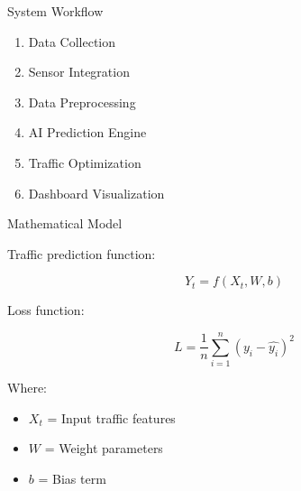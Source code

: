 \documentclass{beamer}
\begin{document}
	\begin{frame}{System Workflow}
		
		\begin{enumerate}
			
			\item Data Collection
			
			\item Sensor Integration
			
			\item Data Preprocessing
			
			\item AI Prediction Engine
			
			\item Traffic Optimization
			
			\item Dashboard Visualization
			
		\end{enumerate}
		
	\end{frame}
	
	
	\begin{frame}{Mathematical Model}
		
		Traffic prediction function:
		
		\[
		Y_t = f(X_t,W,b)
		\]
		
		\vspace{0.5cm}
		
		Loss function:
		
		\[
		L = \frac{1}{n}\sum_{i=1}^{n}(y_i - \hat{y_i})^2
		\]
		
		\vspace{0.5cm}
		
		Where:
		
		\begin{itemize}
			
			\item $X_t$ = Input traffic features
			
			\item $W$ = Weight parameters
			
			\item $b$ = Bias term
			
		\end{itemize}
		
	\end{frame}
	
	
\end{document}
